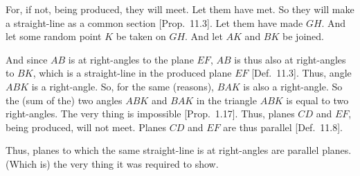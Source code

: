 \begin{Parallel}{}{}
{
\centerline{}

For, if not, being produced, they will meet. Let them have
met. So they will make a straight-line as a common section [Prop.~11.3]. Let them have made $GH$. And let some
random point $K$ be taken on $GH$. And let $AK$ and
$BK$ be joined.

And since $AB$ is at right-angles to the plane $EF$, $AB$ is thus also
at right-angles to  $BK$, which is a straight-line in the produced plane $EF$ [Def.~11.3]. 
Thus, angle $ABK$ is a right-angle.
So, for the same (reasons), $BAK$ is also a right-angle. So the (sum of the)
two angles $ABK$ and $BAK$ in the triangle $ABK$ is equal to
two right-angles. The very thing is impossible [Prop.~1.17]. Thus, planes $CD$ and $EF$, being produced, will not meet.
Planes $CD$ and $EF$ are thus parallel [Def.~11.8].

Thus, planes to which the same straight-line
is at right-angles are  parallel planes. (Which is) the very thing it was required to show.}
\end{Parallel}

